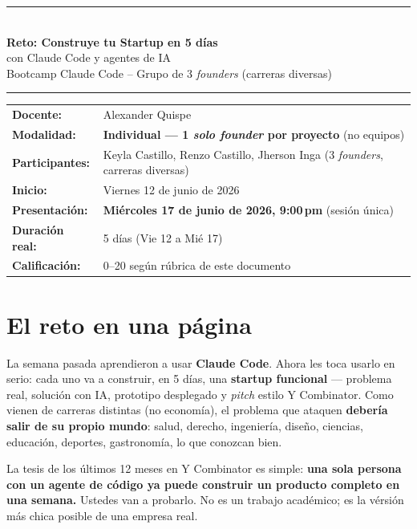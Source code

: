 \documentclass[10.5pt,a4paper]{article}
\begin{document}
\begin{center}
{\color{clawOrange}\rule{\linewidth}{1.5pt}}\\[4pt]
{\Large\bfseries\color{clawDark} Reto: Construye tu Startup en 5 d\'ias}\\[2pt]
{\normalsize\color{clawOrange} con Claude Code y agentes de IA}\\[4pt]
{\small\color{clawGray} Bootcamp Claude Code -- Grupo de 3 \emph{founders} (carreras diversas)}\\[2pt]
{\color{clawOrange}\rule{\linewidth}{0.6pt}}
\end{center}

\vspace{2pt}
\begin{tabularx}{\linewidth}{@{}lX@{}}
\textbf{Docente:} & Alexander Quispe \\
\textbf{Modalidad:} & \textbf{Individual --- 1 \emph{solo founder} por proyecto} (no equipos) \\
\textbf{Participantes:} & Keyla Castillo, Renzo Castillo, Jherson Inga (3 \emph{founders}, carreras diversas) \\
\textbf{Inicio:} & Viernes 12 de junio de 2026 \\
\textbf{Presentaci\'on:} & \textbf{Mi\'ercoles 17 de junio de 2026, 9:00\,pm} (sesi\'on \'unica) \\
\textbf{Duraci\'on real:} & 5 d\'ias (Vie 12 a Mi\'e 17) \\
\textbf{Calificaci\'on:} & 0--20 seg\'un r\'ubrica de este documento \\
\end{tabularx}

\section{El reto en una p\'agina}

La semana pasada aprendieron a usar \textbf{Claude Code}. Ahora les toca usarlo
en serio: cada uno va a construir, en 5 d\'ias, una \textbf{startup funcional}
--- problema real, soluci\'on con IA, prototipo desplegado y \emph{pitch} estilo
Y Combinator. Como vienen de carreras distintas (no econom\'ia), el problema que
ataquen \textbf{deber\'ia salir de su propio mundo}: salud, derecho, ingenier\'ia,
dise\~no, ciencias, educaci\'on, deportes, gastronom\'ia, lo que conozcan bien.

\begin{tcolorbox}[ycbox={Por qu\'e este reto importa}]
La tesis de los \'ultimos 12 meses en Y Combinator es simple: \textbf{una sola
persona con un agente de c\'odigo ya puede construir un producto completo en
una semana.} Ustedes van a probarlo. No es un trabajo acad\'emico; es la
v\'ersi\'on m\'as chica posible de una empresa real.
\end{tcolorbox}
\end{document}
